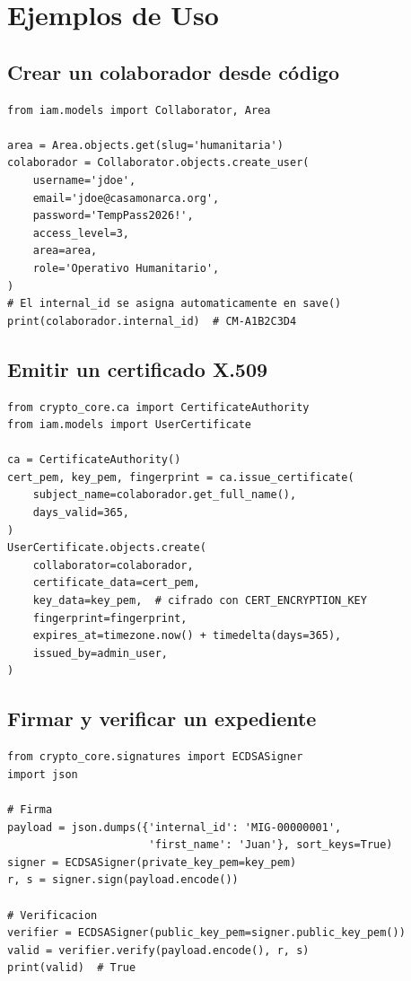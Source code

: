 \documentclass[10pt,letterpaper]{report}
\begin{document}
\chapter{Ejemplos de Uso}

\section{Crear un colaborador desde código}

\begin{lstlisting}[style=python]
from iam.models import Collaborator, Area

area = Area.objects.get(slug='humanitaria')
colaborador = Collaborator.objects.create_user(
    username='jdoe',
    email='jdoe@casamonarca.org',
    password='TempPass2026!',
    access_level=3,
    area=area,
    role='Operativo Humanitario',
)
# El internal_id se asigna automaticamente en save()
print(colaborador.internal_id)  # CM-A1B2C3D4
\end{lstlisting}

\section{Emitir un certificado X.509}

\begin{lstlisting}[style=python]
from crypto_core.ca import CertificateAuthority
from iam.models import UserCertificate

ca = CertificateAuthority()
cert_pem, key_pem, fingerprint = ca.issue_certificate(
    subject_name=colaborador.get_full_name(),
    days_valid=365,
)
UserCertificate.objects.create(
    collaborator=colaborador,
    certificate_data=cert_pem,
    key_data=key_pem,  # cifrado con CERT_ENCRYPTION_KEY
    fingerprint=fingerprint,
    expires_at=timezone.now() + timedelta(days=365),
    issued_by=admin_user,
)
\end{lstlisting}

\section{Firmar y verificar un expediente}

\begin{lstlisting}[style=python]
from crypto_core.signatures import ECDSASigner
import json

# Firma
payload = json.dumps({'internal_id': 'MIG-00000001',
                      'first_name': 'Juan'}, sort_keys=True)
signer = ECDSASigner(private_key_pem=key_pem)
r, s = signer.sign(payload.encode())

# Verificacion
verifier = ECDSASigner(public_key_pem=signer.public_key_pem())
valid = verifier.verify(payload.encode(), r, s)
print(valid)  # True
\end{lstlisting}
\end{document}
